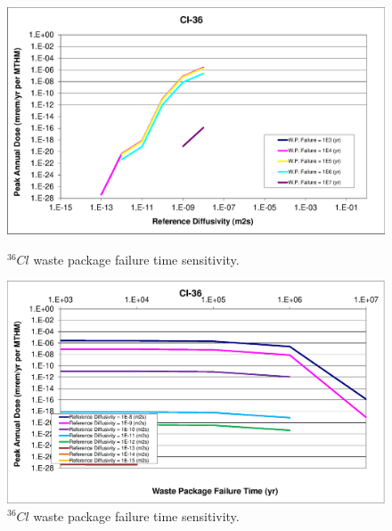 \begin{figure}[ht]
  \begin{minipage}[b]{0.45\linewidth}

    \includegraphics[width=\linewidth]{./chapters/nuclide_sensitivity/clay/WPFailExtended/Cl-36.eps}
    \caption{$^{36}Cl$ waste package failure time sensitivity. }
    \label{fig:WPFailCl36}

  \end{minipage}
  \hspace{0.05\linewidth}
  \begin{minipage}[b]{0.45\linewidth}

    \includegraphics[width=\linewidth]{./chapters/nuclide_sensitivity/clay/WPFailExtended/Cl-36-WPFail.eps}
    \caption{$^{36}Cl$ waste package failure time sensitivity. }
    \label{fig:WPFailPuDaughters}

  \end{minipage}
\end{figure}


